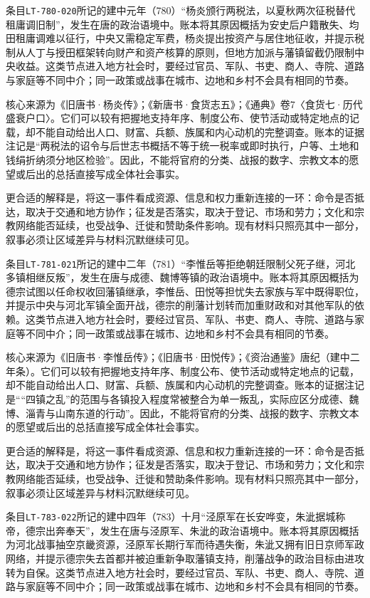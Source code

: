 条目\texttt{LT-780-020}所记的建中元年（780）“杨炎颁行两税法，以夏秋两次征税替代租庸调旧制”，发生在唐的政治语境中。账本将其原因概括为安史后户籍散失、均田租庸调难以征行，中央又需稳定军费，杨炎提出按资产与居住地征收，并提示税制从人丁与授田框架转向财产和资产核算的原则，但地方加派与藩镇留截仍限制中央收益。这类节点进入地方社会时，要经过官员、军队、书吏、商人、寺院、道路与家庭等不同中介；同一政策或战事在城市、边地和乡村不会具有相同的节奏。

核心来源为《旧唐书·杨炎传》；《新唐书·食货志五》；《通典》卷7〈食货七·历代盛衰户口〉。它们可以较有把握地支持年序、制度公布、使节活动或特定地点的记载，却不能自动给出人口、财富、兵额、族属和内心动机的完整调查。账本的证据注记是“两税法的诏令与后世志书概括不等于统一税率或即时执行，户等、土地和钱绢折纳须分地区检验”。因此，不能将官府的分类、战报的数字、宗教文本的愿望或后出的总括直接写成全体社会事实。

更合适的解释是，将这一事件看成资源、信息和权力重新连接的一环：命令是否抵达，取决于交通和地方协作；征发是否落实，取决于登记、市场和劳力；文化和宗教网络能否延续，也受战争、迁徙和赞助条件影响。现有材料只照亮其中一部分，叙事必须让区域差异与材料沉默继续可见。

条目\texttt{LT-781-021}所记的建中二年（781）“李惟岳等拒绝朝廷限制父死子继，河北多镇相继反叛”，发生在唐与成德、魏博等镇的政治语境中。账本将其原因概括为德宗试图以任命权收回藩镇继承，李惟岳、田悦等担忧失去家族与军中既得职位，并提示中央与河北军镇全面开战，德宗的削藩计划转而加重财政和对其他军队的依赖。这类节点进入地方社会时，要经过官员、军队、书吏、商人、寺院、道路与家庭等不同中介；同一政策或战事在城市、边地和乡村不会具有相同的节奏。

核心来源为《旧唐书·李惟岳传》；《旧唐书·田悦传》；《资治通鉴》唐纪（建中二年条）。它们可以较有把握地支持年序、制度公布、使节活动或特定地点的记载，却不能自动给出人口、财富、兵额、族属和内心动机的完整调查。账本的证据注记是““四镇之乱”的范围与各镇投入程度常被整合为单一叛乱，实际应区分成德、魏博、淄青与山南东道的行动”。因此，不能将官府的分类、战报的数字、宗教文本的愿望或后出的总括直接写成全体社会事实。

更合适的解释是，将这一事件看成资源、信息和权力重新连接的一环：命令是否抵达，取决于交通和地方协作；征发是否落实，取决于登记、市场和劳力；文化和宗教网络能否延续，也受战争、迁徙和赞助条件影响。现有材料只照亮其中一部分，叙事必须让区域差异与材料沉默继续可见。

条目\texttt{LT-783-022}所记的建中四年（783）十月“泾原军在长安哗变，朱泚据城称帝，德宗出奔奉天”，发生在唐与泾原军、朱泚的政治语境中。账本将其原因概括为河北战事抽空京畿资源，泾原军长期行军而待遇失衡，朱泚又拥有旧日京师军政网络，并提示德宗失去首都并被迫重新争取藩镇支持，削藩战争的政治目标由进攻转为自保。这类节点进入地方社会时，要经过官员、军队、书吏、商人、寺院、道路与家庭等不同中介；同一政策或战事在城市、边地和乡村不会具有相同的节奏。

